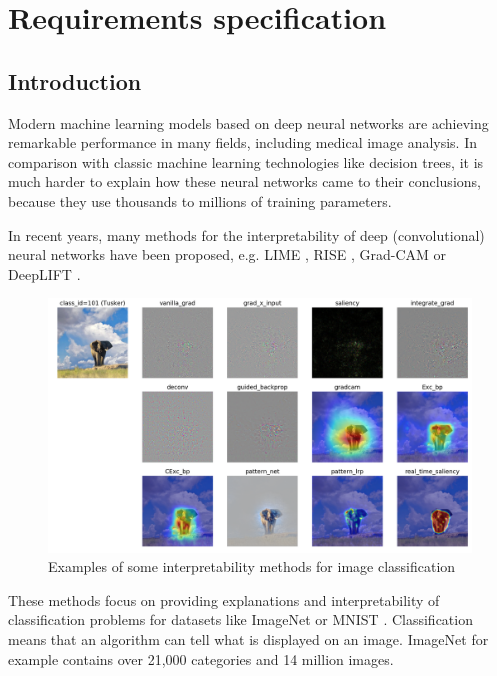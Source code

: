\chapter{Requirements specification}
\label{appendix_a}

\section{Introduction}
Modern machine learning models based on deep neural networks are achieving remarkable performance in many fields, including medical image analysis. In comparison with classic machine learning technologies like decision trees, it is much harder to explain how these neural networks came to their conclusions, because they use thousands to millions of training parameters.

In recent years, many methods for the interpretability of deep (convolutional) neural networks have been proposed, e.g. LIME \cite{ribeiro2016should}, RISE \cite{Petsiuk2018rise}, Grad-CAM \cite{selvaraju2017grad} or DeepLIFT \cite{shrikumar2017learning}.

\begin{figure}[h]
\centering
\caption{Examples of some interpretability methods for image classification \cite{visualattribution}}
\includegraphics[width=14cm]{images/tusker_saliency.png}
\end{figure}

These methods focus on providing explanations and interpretability of classification problems for datasets like ImageNet \cite{imagenet_cvpr09} or MNIST \cite{lecun1998gradient}. Classification means that an algorithm can tell what is displayed on an image. ImageNet for example contains over 21,000 categories and 14 million images.

